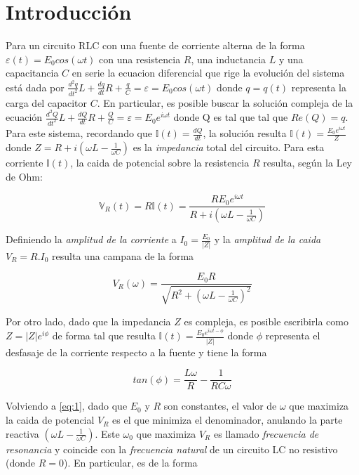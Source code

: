 \documentclass[11pt,a4paper]{article}
\begin{document}
\section{Introducción}\label{sec:intro}

Para un circuito RLC con una fuente de corriente alterna de la forma $\varepsilon(t) = E_{0}cos(\omega t)$ con una resistencia $R$, una inductancia $L$ y una capacitancia $C$ en serie la ecuacion diferencial que rige la evolución del sistema está dada por $\frac{d^2q}{dt^2}L+\frac{dq}{dt}R+\frac{q}{C} = \varepsilon = E_{0}cos(\omega t)$ donde $q = q(t)$ representa la carga del capacitor $C$. En particular, es posible buscar la solución compleja de la ecuación $\frac{d^2Q}{dt^2}L+\frac{dQ}{dt}R+\frac{Q}{C} = \varepsilon = E_{0}e^{i\omega t}$ donde Q es tal que tal que $Re(Q) = q$. Para este sistema, recordando que $\mathbb{I}(t) = \frac{dQ}{dt}$, la solución resulta $\mathbb{I}(t) = \frac{E_0e^{i\omega t}}{Z}$ donde $Z = R +i(\omega L-\frac{1}{\omega C})$ es la \textit{impedancia} total del circuito. Para esta corriente $\mathbb{I}(t)$, la caida de potencial sobre la resistencia $R$ resulta, según la Ley de Ohm: 

\begin{equation}
\mathbb{V}_R(t) = R\mathbb{I}(t) = \frac{RE_0e^{i\omega t}}{R +i(\omega L-\frac{1}{\omega C})}
\label{eq:ohm}
\end{equation}

Definiendo la \textit{amplitud de la corriente} a $I_0 = \frac{E_0}{|Z|}$ y la \textit{amplitud de la caida} $V_R = R.I_0$ resulta una campana de la forma

\begin{equation}
V_R(\omega) = \frac{E_{0}R}{\sqrt{R^2 + (\omega L - \frac{1}{\omega C})^2}}
\label{eq:1}
\end{equation}

Por otro lado, dado que la impedancia $Z$ es compleja, es posible escribirla como $Z = |Z|e^{i\phi}$ de forma tal que resulta $\mathbb{I}(t) = \frac{E_0e^{i\omega t-\phi}}{|Z|}$ donde $\phi$ representa el desfasaje de la corriente respecto a la fuente y tiene la forma

\begin{equation}
tan(\phi) = \frac{L\omega}{R} - \frac{1}{RC\omega} 
\label{eq:2}
\end{equation}

Volviendo a \eqref{eq:1}, dado que $E_0$ y $R$ son constantes, el valor de $\omega$ que maximiza la caida de potencial $V_R$ es el que minimiza el denominador, anulando la parte reactiva $(\omega L - \frac{1}{\omega C})$. Este $\omega_0$ que maximiza $V_R$ es llamado \textit{frecuencia de resonancia} y coincide con la \textit{frecuencia natural} de un circuito LC no resistivo (donde $R=0$). En particular, es de la forma 
\end{document}
